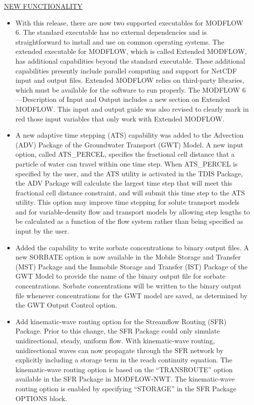	
	\item \currentmodflowversion
	
	\underline{NEW FUNCTIONALITY}
	\begin{itemize}
		\item With this release, there are now two supported executables for MODFLOW 6.  The standard executable has no external dependencies and is straightforward to install and use on common operating systems.  The extended executable for MODFLOW, which is called Extended MODFLOW, has additional capabilities beyond the standard executable.  These additional capabilities presently include parallel computing and support for NetCDF input and output files.  Extended MODFLOW relies on third-party libraries, which must be available for the software to run properly.  The MODFLOW 6---Description of Input and Output includes a new section on Extended MODFLOW.  This input and output guide was also revised to clearly mark in red those input variables that only work with Extended MODFLOW.  
		\item A new adaptive time stepping (ATS) capability was added to the Advection (ADV) Package of the Groundwater Transport (GWT) Model.  A new input option, called ATS\_PERCEL, specifies the fractional cell distance that a particle of water can travel within one time step.  When ATS\_PERCEL is specified by the user, and the ATS utility is activated in the TDIS Package, the ADV Package will calculate the largest time step that will meet this fractional cell distance constraint, and will submit this time step to the ATS utility.  This option may improve time stepping for solute transport models and for variable-density flow and transport models by allowing step lengths to be calculated as a function of the flow system rather than being specified as input by the user.
		\item Added the capability to write sorbate concentrations to binary output files.  A new SORBATE option is now available in the Mobile Storage and Transfer (MST) Package and the Immobile Storage and Transfer (IST) Package of the GWT Model to provide the name of the binary output file for sorbate concentrations. Sorbate concentrations will be written to the binary output file whenever concentrations for the GWT model are saved, as determined by the GWT Output Control option.
		\item Add kinematic-wave routing option for the Streamflow Routing (SFR) Package. Prior to this change, the SFR Package could only simulate unidirectional, steady, uniform flow. With kinematic-wave routing, unidirectional waves can now propagate through the SFR network by explicitly including a storage term in the reach continuity equation. The kinematic-wave routing option is based on the ``TRANSROUTE'' option available in the SFR Package in MODFLOW-NWT. The kinematic-wave routing option is enabled by specifying ``STORAGE'' in the SFR Package OPTIONS block.

\end{itemize}
